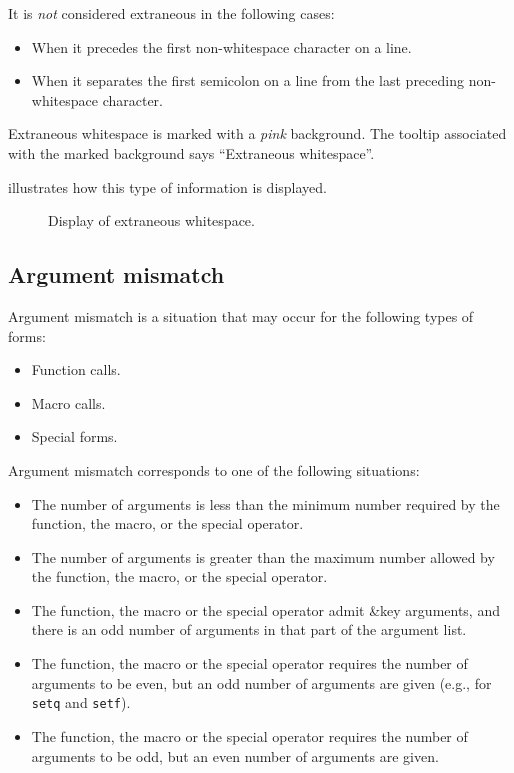 It is \emph{not} considered extraneous in the following cases:

\begin{itemize}
\item When it precedes the first non-whitespace character on a line. 
\item When it separates the first semicolon on a line from the last
  preceding non-whitespace character. 
\end{itemize}

Extraneous whitespace is marked with a \emph{pink} background.  The
tooltip associated with the marked background says ``Extraneous
whitespace''. 

 illustrates how this type of
information is displayed.

\begin{figure}
\begin{center}
\end{center}
\caption{\label{fig-extraneous-whitespace}
Display of extraneous whitespace.}
\end{figure}

\subsection{Argument mismatch}

Argument mismatch is a situation that may occur for the following
types of forms:

\begin{itemize}
\item Function calls.
\item Macro calls.
\item Special forms.
\end{itemize}

Argument mismatch corresponds to one of the following situations:

\begin{itemize}
\item The number of arguments is less than the minimum number required
  by the function, the macro, or the special operator.
\item The number of arguments is greater than the maximum number
  allowed by the function, the macro, or the special operator.
\item The function, the macro or the special operator admit \&key
  arguments, and there is an odd number of arguments in that part of
  the argument list.
\item The function, the macro or the special operator requires the
  number of arguments to be even, but an odd number of arguments are
  given (e.g., for \texttt{setq} and \texttt{setf}).
\item The function, the macro or the special operator requires the
  number of arguments to be odd, but an even number of arguments are
  given.
\end{itemize}

